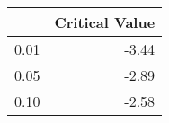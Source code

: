 \begin{tabular}{lr}
\toprule
{} &  Critical Value \\
\midrule
0.01 &           -3.44 \\
0.05 &           -2.89 \\
0.10 &           -2.58 \\
\bottomrule
\end{tabular}
